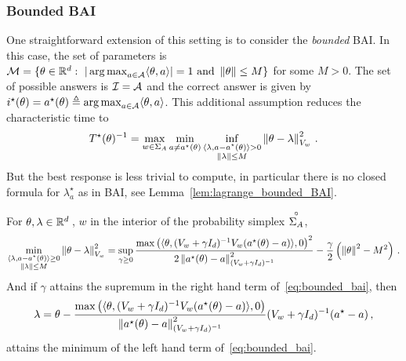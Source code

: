 \subsubsection{Bounded BAI}
\label{app:bounded_bai}
One straightforward extension of this setting is to consider the \emph{bounded} BAI. In this case, the set of parameters is $\mathcal{M}=\{\theta \in \mathbb{R}^d:\ |\operatorname*{arg\,max}_{a\in\mathcal{A}} \langle\theta,a\rangle|=1 \text{ and } \left\lVert\theta\right\rVert\leq M\}$ for some $M>0$. The set of possible answers is $\mathcal{I} = \mathcal{A}$ and the correct answer is given by $i^\star(\theta)=a^\star(\theta)\triangleq \operatorname*{arg\,max}_{a\in\mathcal{A}} \langle\theta,a\rangle$.
This additional assumption reduces the characteristic time to
\[
T^{\star}(\theta)^{-1} = \max_{w\in\Sigma_A} \min_{a\neq a^\star(\theta)} \inf_{\substack{\langle \lambda,a-a^\star(\theta)\rangle>0\\ \left\lVert\lambda\right\rVert\leq M}} \left\lVert\theta -\lambda \right\rVert_{V_w}^2 \,.
\]
But the best response is less trivial to compute, in particular there is no closed formula for $\lambda^\star_a$ as in BAI, see Lemma~\ref{lem:lagrange_bounded_BAI}.
\begin{lemma}
  \label{lem:lagrange_bounded_BAI}
For $\theta, \lambda \in \mathbb{R}^d\,$, $w$ in the interior of the probability simplex $\overset{\circ}{\Sigma_A}$,
\begin{align}\label{eq:bounded_bai}
\min_{\substack{\langle \lambda,a-a^\star(\theta)\rangle\geq 0\\ \left\lVert\lambda\right\rVert\leq M}} \left\lVert\theta -\lambda \right\rVert_{V_w}^2 = \sup_{\gamma\geq 0} \frac{\max\left(\langle \theta, (V_w+\gamma I_d)^{-1} V_w (a^\star(\theta)-a)\rangle,0\right)^2 }{2\left\lVert a^\star(\theta)-a\right\rVert^2_{(V_w+\gamma I_d)^{-1}}}- \frac{\gamma}{2}\left(\left\lVert\theta\right\rVert^2-M^2\right)\,.
\end{align}
And if $\gamma$ attains the supremum in the right hand term of~\eqref{eq:bounded_bai}, then
\[
\lambda = \theta - \frac{\max\left(\langle \theta, (V_w+\gamma I_d)^{-1} V_w (a^\star(\theta)-a)\rangle,0\right)}{\left\lVert a^\star(\theta)-a\right\rVert^2_{(V_w+\gamma I_d)^{-1}}} (V_w+\gamma I_d)^{-1}(a^\star - a)\,,
\]
attains the minimum of the left hand term of~\eqref{eq:bounded_bai}.
\end{lemma}
